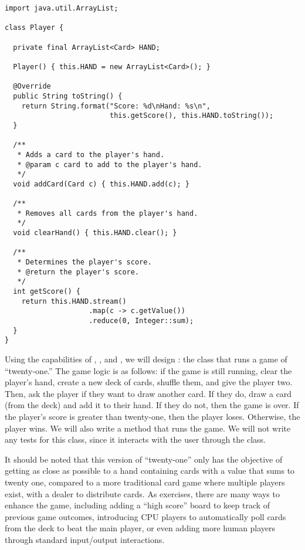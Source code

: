 \begin{lstlisting}[language=MyJava]
import java.util.ArrayList;

class Player {

  private final ArrayList<Card> HAND;

  Player() { this.HAND = new ArrayList<Card>(); }

  @Override
  public String toString() {
    return String.format("Score: %d\nHand: %s\n", 
                         this.getScore(), this.HAND.toString());
  }

  /**
   * Adds a card to the player's hand.
   * @param c card to add to the player's hand.
   */
  void addCard(Card c) { this.HAND.add(c); }

  /**
   * Removes all cards from the player's hand.
   */
  void clearHand() { this.HAND.clear(); }

  /**
   * Determines the player's score.
   * @return the player's score.
   */
  int getScore() {
    return this.HAND.stream()
                    .map(c -> c.getValue())
                    .reduce(0, Integer::sum);
  }
}
\end{lstlisting}

Using the capabilities of , , and , we will design : the class that runs a game of ``twenty-one.'' 
The game logic is as follows: if the game is still running, clear the player's hand, create a new deck of cards, shuffle them, and give the player two. 
Then, ask the player if they want to draw another card. 
If they do, draw a card (from the deck) and add it to their hand. 
If they do not, then the game is over. 
If the player's score is greater than twenty-one, then the player loses. Otherwise, the player wins. 
We will also write a  method that runs the game. 
We will not write any tests for this class, since it interacts with the user through the  class.

It should be noted that this version of ``twenty-one'' only has the objective of getting as close as possible to a hand containing cards with a value that sums to twenty one, compared to a more traditional card game where multiple players exist, with a dealer to distribute cards. 
As exercises, there are many ways to enhance the game, including adding a ``high score'' board to keep track of previous game outcomes, introducing CPU players to automatically poll cards from the deck to beat the main player, or even adding more human players through standard input/output interactions. 

